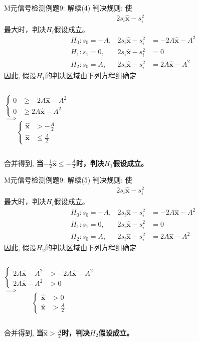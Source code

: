 \begin{frame}[shrink]{M元信号检测例题9: 解续(4)}
判决规则: 使
\begin{align*}
2s_i\bm{\hat{x}}-s_i^2
\end{align*}
最大时，判决$H_i$假设成立。
\begin{align*}
&H_0: s_0=-A, &2s_i\bm{\hat{x}}-s_i^2&=-2A\bm{\hat{x}}-A^2\\
&H_1: s_1=0, &2s_i\bm{\hat{x}}-s_i^2&=0\\
&H_2: s_0=A, &2s_i\bm{\hat{x}}-s_i^2&=2A\bm{\hat{x}}-A^2
\end{align*}
因此, 假设$H_1$的判决区域由下列方程组确定
\begin{columns}
	$$
	\begin{cases}
	0&\ge -2A\bm{\hat{x}}-A^2\\
	0&\ge 2A\bm{\hat{x}}-A^2
	\end{cases}
	$$
	$\implies$
	$$
	\begin{cases}
	\bm{\hat{x}}&> -\frac{A}{2}\\
	\bm{\hat{x}}&\le \frac{A}{2}
	\end{cases}
	$$
\end{columns}
合并得到, \textbf{当$-\frac{1}{2}\bm{\hat{x}}\le -\frac{A}{2}$时，判决$H_1$假设成立。}
\end{frame}

\begin{frame}[shrink]{M元信号检测例题9: 解续(5)}
判决规则: 使
\begin{align*}
2s_i\bm{\hat{x}}-s_i^2
\end{align*}
最大时，判决$H_i$假设成立。
\begin{align*}
&H_0: s_0=-A, &2s_i\bm{\hat{x}}-s_i^2&=-2A\bm{\hat{x}}-A^2\\
&H_1: s_1=0, &2s_i\bm{\hat{x}}-s_i^2&=0\\
&H_2: s_0=A, &2s_i\bm{\hat{x}}-s_i^2&=2A\bm{\hat{x}}-A^2
\end{align*}
因此, 假设$H_2$的判决区域由下列方程组确定
\begin{columns}
	$$
	\begin{cases}
	2A\bm{\hat{x}}-A^2 &> -2A\bm{\hat{x}}-A^2\\
	2A\bm{\hat{x}}-A^2 &> 0
	\end{cases}
	$$
	$\implies$
	$$
	\begin{cases}
	\bm{\hat{x}}&> 0\\
	\bm{\hat{x}}&> \frac{A}{2}
	\end{cases}
	$$
\end{columns}
合并得到, \textbf{当$\bm{\hat{x}}>\frac{A}{2}$时，判决$H_2$假设成立。}
\end{frame}